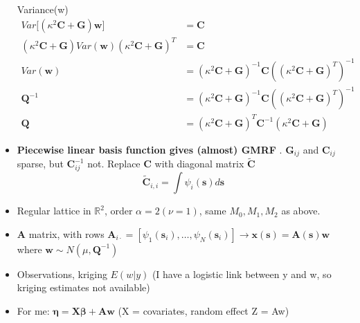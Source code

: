 \documentclass{article}
\begin{document}
\begin{itemize}
Variance(w)
\begin{align}
Var \big[ \left(\kappa^{2} \pmb{C} + \pmb{G} \right) \pmb{w} \big] & = \pmb{C} \\
\left( \kappa^{2} \pmb{C} + \pmb{G} \right) Var(\pmb{w}) \left( \kappa^{2} \pmb{C} + \pmb{G} \right)^{T} & = \pmb{C} \\
Var(\pmb{w}) & = \left( \kappa^{2} \pmb{C} + \pmb{G} \right)^{-1} \pmb{C} \left( \left( \kappa^{2} \pmb{C} + \pmb{G} \right)^{T} \right)^{-1} \\
\pmb{Q}^{-1} & = \left( \kappa^{2} \pmb{C} + \pmb{G} \right)^{-1} \pmb{C} \left( \left( \kappa^{2} \pmb{C} + \pmb{G} \right)^{T} \right)^{-1} \\
\pmb{Q} & = \left( \kappa^{2} \pmb{C} + \pmb{G} \right)^{T} \pmb{C}^{-1} \left( \kappa^{2} \pmb{C} + \pmb{G} \right)  
\end{align}
\item {\bf Piecewise linear basis function gives (almost) GMRF} \citep{Lindgren2011}. $\pmb{G}_{ij}$ and $\pmb{C}_{ij}$ sparse, but $\pmb{C}_{ij}^{-1}$ not. Replace $\pmb{C}$ with diagonal matrix $\widetilde{\pmb{C}}$
$$ \widetilde{\pmb{C}}_{i,i} = \int \psi_{i}(\pmb{s}) d\pmb{s} $$
\item Regular lattice in $\mathbb{R}^{2}$, order $\alpha = 2 (\nu = 1)$, same $M_{0}, M_{1}, M_{2}$ as above.
\item $\pmb{A}$ matrix, with rows $\pmb{A}_{i\cdot} = [\psi_{1}(\pmb{s}_{i}), \dots, \psi_{N}(\pmb{s}_{i}) ] \rightarrow \pmb{x}(\pmb{s}) = \pmb{A}(\pmb{s})\pmb{w}$ where $\pmb{w} \sim N(\mu, \pmb{Q}^{-1})$
\item Observations, kriging $E(w|y)$ (I have a logistic link between y and w, so kriging estimates not available)
\item For me: $\pmb{\eta} = \pmb{X\beta} + \pmb{Aw}$ (X = covariates, random effect Z = Aw)
\end{itemize}
\end{document}
